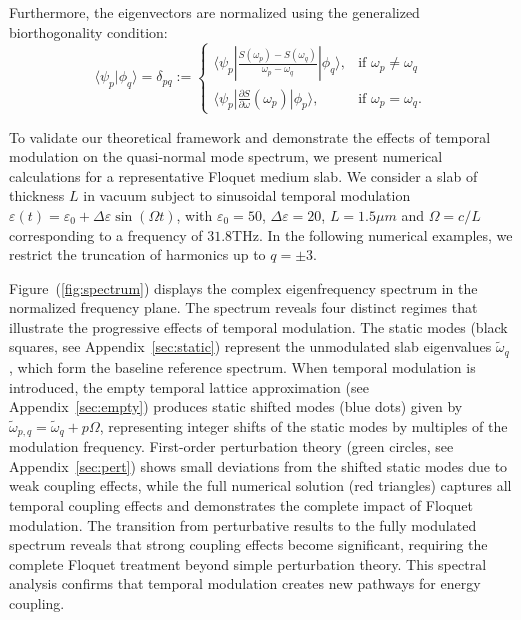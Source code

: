 \documentclass[%
 reprint,
 amsmath,amssymb,
 aps,
 prb,
]{revtex4-2}
\begin{document}
Furthermore, the eigenvectors are normalized using the generalized biorthogonality condition:
\begin{equation}
    \langle \psi_p | \phi_q \rangle = \delta_{pq} := \begin{cases}
        \langle \psi_p | \frac{{S}(\omega_p)-{S}(\omega_q)}{\omega_p - \omega_q} | \phi_q \rangle, & \text{if } \omega_p \neq \omega_q \\[1ex]
       \langle \psi_p |\frac{\partial {S}}{\partial \omega}(\omega_p) | \phi_p \rangle, & \text{if } \omega_p = \omega_q.
    \end{cases}
    \label{eq:ortho}
\end{equation}


To validate our theoretical framework and demonstrate the effects of temporal modulation on the quasi-normal mode spectrum, we present numerical calculations for a representative Floquet medium slab. We consider a slab of thickness $L$ in vacuum subject to sinusoidal temporal modulation $\varepsilon(t) = \varepsilon_0 + \Delta \varepsilon \sin(\Omega t)$, with $\varepsilon_0 = 50$, $\Delta\varepsilon = 20$, $L = 1.5\mu m$ and $\Omega=c/L$ corresponding to a frequency of $31.8$THz. In the following numerical examples, we restrict the truncation of harmonics up to $q=\pm3$.

Figure~(\ref{fig:spectrum}) displays the complex eigenfrequency spectrum in the normalized frequency plane. The spectrum reveals four distinct regimes that illustrate the progressive effects of temporal modulation. The static modes (black squares, see Appendix~\ref{sec:static}) represent the unmodulated slab eigenvalues $\widetilde{\omega}_q$, which form the baseline reference spectrum. When temporal modulation is introduced, the empty temporal lattice approximation (see Appendix~\ref{sec:empty}) produces static shifted modes (blue dots) given by $\widetilde{\omega}_{p,q} = \widetilde{\omega}_q + p\Omega$, representing integer shifts of the static modes by multiples of the modulation frequency. First-order perturbation theory (green circles, see Appendix~\ref{sec:pert}) shows small deviations from the shifted static modes due to weak coupling effects, while the full numerical solution (red triangles) captures all temporal coupling effects and demonstrates the complete impact of Floquet modulation.
The transition from perturbative results to the fully modulated spectrum reveals that strong coupling effects become significant, requiring the complete Floquet treatment beyond simple perturbation theory. This spectral analysis confirms that temporal modulation creates new pathways for energy coupling.
\end{document}
